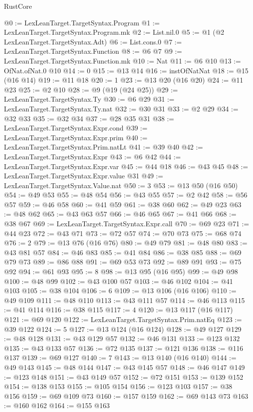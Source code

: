 \begin{lexlean}{RustCore}
\begin{coremodule}
@0 := LexLeanTarget.TargetSyntax.Program
@1 := LexLeanTarget.TargetSyntax.Program.mk
@2 := List.nil.{0}
@5 := @1 (@2 LexLeanTarget.TargetSyntax.Adt)
@6 := List.cons.{0}
@7 := LexLeanTarget.TargetSyntax.Function
@8 := @6 @7
@9 := LexLeanTarget.TargetSyntax.Function.mk
@10 := Nat
@11 := @6 @10
@13 := OfNat.ofNat.{0} @10
@14 := 0
@15 := @13 @14
@16 := instOfNatNat
@18 := @15 (@16 @14)
@19 := @11 @18
@20 := 1
@23 := @13 @20 (@16 @20)
@24 := @11 @23
@25 := @2 @10
@28 := @9 (@19 (@24 @25))
@29 := LexLeanTarget.TargetSyntax.Ty
@30 := @6 @29
@31 := LexLeanTarget.TargetSyntax.Ty.nat
@32 := @30 @31
@33 := @2 @29
@34 := @32 @33
@35 := @32 @34
@37 := @28 @35 @31
@38 := LexLeanTarget.TargetSyntax.Expr.cond
@39 := LexLeanTarget.TargetSyntax.Expr.prim
@40 := LexLeanTarget.TargetSyntax.Prim.natLt
@41 := @39 @40
@42 := LexLeanTarget.TargetSyntax.Expr
@43 := @6 @42
@44 := LexLeanTarget.TargetSyntax.Expr.var
@45 := @44 @18
@46 := @43 @45
@48 := LexLeanTarget.TargetSyntax.Expr.value @31
@49 := LexLeanTarget.TargetSyntax.Value.nat
@50 := 3
@53 := @13 @50 (@16 @50)
@54 := @49 @53
@55 := @48 @54
@56 := @43 @55
@57 := @2 @42
@58 := @56 @57
@59 := @46 @58
@60 := @41 @59
@61 := @38 @60
@62 := @49 @23
@63 := @48 @62
@65 := @43 @63 @57
@66 := @46 @65
@67 := @41 @66
@68 := @38 @67
@69 := LexLeanTarget.TargetSyntax.Expr.call
@70 := @69 @23
@71 := @44 @23
@72 := @43 @71
@73 := @72 @57
@74 := @70 @73
@75 := @68 @74
@76 := 2
@79 := @13 @76 (@16 @76)
@80 := @49 @79
@81 := @48 @80
@83 := @43 @81 @57
@84 := @46 @83
@85 := @41 @84
@86 := @38 @85
@88 := @69 @79 @73
@89 := @86 @88
@91 := @69 @53 @73
@92 := @89 @91
@93 := @75 @92
@94 := @61 @93
@95 := 8
@98 := @13 @95 (@16 @95)
@99 := @49 @98
@100 := @48 @99
@102 := @43 @100 @57
@103 := @46 @102
@104 := @41 @103
@105 := @38 @104
@106 := 6
@109 := @13 @106 (@16 @106)
@110 := @49 @109
@111 := @48 @110
@113 := @43 @111 @57
@114 := @46 @113
@115 := @41 @114
@116 := @38 @115
@117 := 4
@120 := @13 @117 (@16 @117)
@121 := @69 @120
@122 := LexLeanTarget.TargetSyntax.Prim.natEq
@123 := @39 @122
@124 := 5
@127 := @13 @124 (@16 @124)
@128 := @49 @127
@129 := @48 @128
@131 := @43 @129 @57
@132 := @46 @131
@133 := @123 @132
@135 := @43 @133 @57
@136 := @72 @135
@137 := @121 @136
@138 := @116 @137
@139 := @69 @127
@140 := 7
@143 := @13 @140 (@16 @140)
@144 := @49 @143
@145 := @48 @144
@147 := @43 @145 @57
@148 := @46 @147
@149 := @123 @148
@151 := @43 @149 @57
@152 := @72 @151
@153 := @139 @152
@154 := @138 @153
@155 := @105 @154
@156 := @123 @103
@157 := @38 @156
@159 := @69 @109 @73
@160 := @157 @159
@162 := @69 @143 @73
@163 := @160 @162
@164 := @155 @163

\end{coremodule}
\end{lexlean}
